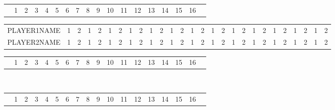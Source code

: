 
\begin{table}
\begin{tabular}{p{5cm}|c|c|c|c|c|c!{\vrule width 2pt}c|c|c|c|c|c|c|c|c|c!{\vrule width 3pt}p{1cm}!{\vrule width 3pt}}
& 1 & 2 & 3 & 4 & 5 & 6 & 7 & 8 & 9 & 10 & 11 & 12 & 13 & 14 & 15 & 16 & \\
\end{tabular}
\begin{tabular}{p{5cm}|c|c|c|c|c|c|c|c|c|c|c|c|c|c|c|c|c|c|c|c|c|c|c|c|c|c|}
\cline{2-27}
PLAYER1NAME & \footnotesize 1 & \footnotesize 2 & \footnotesize 1 & \footnotesize 2 & \footnotesize 1 & \footnotesize 2 & \footnotesize 1 & \footnotesize 2 & \footnotesize 1 & \footnotesize 2 & \footnotesize 1 & \footnotesize 2 & \footnotesize 1 & \footnotesize 2 & \footnotesize 1 & \footnotesize 2 & \footnotesize 1 & \footnotesize 2 & \footnotesize 1 & \footnotesize 2 & \footnotesize 1 & \footnotesize 2 & \footnotesize 1 & \footnotesize 2 & \footnotesize 1 & \footnotesize 2 \\
\cline{1-27}
\cline{1-27}
PLAYER2NAME & \footnotesize 1 & \footnotesize 2 & \footnotesize 1 & \footnotesize 2 & \footnotesize 1 & \footnotesize 2 & \footnotesize 1 & \footnotesize 2 & \footnotesize 1 & \footnotesize 2 & \footnotesize 1 & \footnotesize 2 & \footnotesize 1 & \footnotesize 2 & \footnotesize 1 & \footnotesize 2 & \footnotesize 1 & \footnotesize 2 & \footnotesize 1 & \footnotesize 2 & \footnotesize 1 & \footnotesize 2 & \footnotesize 1 & \footnotesize 2 & \footnotesize 1 & \footnotesize 2 \\
\cline{2-27}
\end{tabular}
\begin{tabular}{p{5cm}|c|c|c|c|c|c!{\vrule width 2pt}c|c|c|c|c|c|c|c|c|c!{\vrule width 3pt}p{1cm}!{\vrule width 3pt}}
& 1 & 2 & 3 & 4 & 5 & 6 & 7 & 8 & 9 & 10 & 11 & 12 & 13 & 14 & 15 & 16 & \\
\end{tabular}
~\\
\begin{tabular}{p{5cm}|c|c|c|c|c|c!{\vrule width 2pt}c|c|c|c|c|c|c|c|c|c!{\vrule width 3pt}p{1cm}!{\vrule width 3pt}}
& 1 & 2 & 3 & 4 & 5 & 6 & 7 & 8 & 9 & 10 & 11 & 12 & 13 & 14 & 15 & 16 & \\
\end{tabular}
\begin{tabular}{p{5cm}|c|c|c|c|c|c|c|c|c|c|c|c|c|c|c|c|c|c|c|c|c|c|c|c|c|c|}

\end{tabular}
\end{table}
